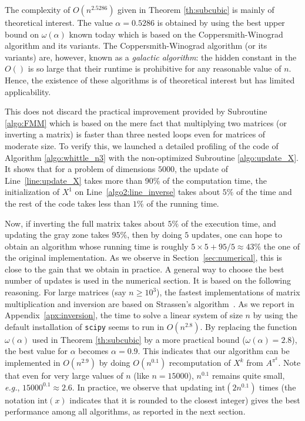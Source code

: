 \documentclass[acmsmall,screen,anonymous]{acmart}
\begin{document}
The complexity of $O(n^{2.5286})$ given in Theorem \ref{th:subcubic} is mainly of theoretical interest. The value $\alpha = 0.5286$ is obtained by using the best upper bound  on $\omega(\alpha)$ known today which is based on the Coppersmith-Winograd algorithm and its variants. The Coppersmith-Winograd algorithm (or its variants) are, however, known as a \emph{galactic algorithm}: the hidden constant in the $O()$ is so large that their runtime is prohibitive for any reasonable value of $n$. Hence, the existence of these algorithms is of theoretical interest but has limited applicability.

This does not discard the practical improvement provided by Subroutine \ref{algo:FMM} which is based on the mere fact that multiplying  two matrices (or inverting a matrix) is faster than three nested loops even for matrices of moderate size. To verify this, we launched  a detailed profiling of the code of Algorithm \ref{algo:whittle_n3} with the non-optimized Subroutine \ref{algo:update_X}. It shows that for a problem of dimensions $5000$, the update of Line~\ref{line:update_X} takes more than 90\% of the computation time, the initialization of $X^1$ on Line~\ref{algo2:line_inverse} takes about $5\%$ of the time and the rest of the code takes less than $1\%$ of the running time.

Now, if inverting the full matrix takes about $5\%$ of the execution time, and updating the gray zone takes $95\%$, then by doing $5$ updates, one can hope to obtain an algorithm whose running time is roughly $5\times5 + 95/5\approx43\%$ the one of the original implementation. As we observe in Section~\ref{sec:numerical}, this is close to the gain that we obtain in practice. A general way to choose the best number of updates is used in the numerical section. It is based on the following reasoning. For large matrices (say $n\ge 10^3$), the fastest implementations of matrix multiplication and inversion are based on Strassen's algorithm~\cite{huang2016strassen,huang2018practical}. As we report in Appendix~\ref{apx:inversion}, the time to solve a linear system of size $n$ by using the default installation of \texttt{scipy} seems to run in $O(n^{2.8})$. By replacing the function $\omega(\alpha)$ used in Theorem \ref{th:subcubic} by a more practical bound ($\omega(\alpha)=2.8$), the best value for $\alpha$ becomes $\alpha = 0.9$. This indicates that our algorithm can be implemented in $O(n^{2.9})$ by doing $O(n^{0.1})$ recomputation of $X^k$ from $A^{\pi^k}$. Note that even for very large values of $n$ (like $n=15000$), $n^{0.1}$ remains quite small, \emph{e.g.}, $15000^{0.1}\approx 2.6$. In practice, we observe that updating $\mathrm{int}(2n^{0.1})$ times (the notation $\mathrm{int}(x)$ indicates that it is rounded to the closest integer) gives the best performance among all algorithms, as reported in the next section.
\end{document}
